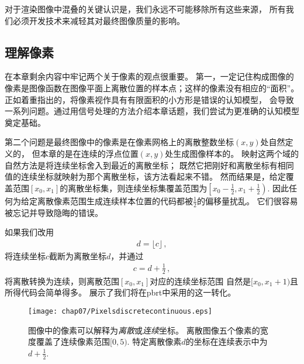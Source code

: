对于渲染图像中混叠的关键认识是，我们永远不可能移除所有这些来源，
所有我们必须开发技术来减轻其对最终图像质量的影响。

\subsection{理解像素}\label{sub:理解像素}
在本章剩余内容中牢记两个关于像素的观点很重要。
第一，一定记住构成图像的像素是图像函数在图像平面上离散位置的样本点；这样的像素没有相应的“面积”。
正如\citet{Smith95apixel}着重指出的，将像素视作具有有限面积的小方形是错误的认知模型，
会导致一系列问题。通过用信号处理的方法介绍本章话题，我们尝试为更准确的认知模型奠定基础。

第二个问题是最终图像中的像素是在像素网格上的离散整数坐标$(x,y)$处自然定义的，
但本章的是在连续的浮点位置$(x,y)$处生成图像样本的。
映射这两个域的自然方法是将连续坐标舍入到最近的离散坐标；
既然它把刚好和离散坐标有相同值的连续坐标就映射为那个离散坐标，该方法看起来不错。
然而结果是，给定覆盖范围$[x_0,x_1]$的离散坐标集，则连续坐标集覆盖范围为$\displaystyle\left[x_0-\frac{1}{2},x_1+\frac{1}{2}\right)$.
因此任何为给定离散像素范围生成连续样本位置的代码都被$\displaystyle\frac{1}{2}$的偏移量扰乱。
它们很容易被忘记并导致隐晦的错误。

如果我们改用
\begin{align*}
    d=\lfloor c\rfloor\, ,
\end{align*}
将连续坐标$c$截断为离散坐标$d$，并通过
\begin{align*}
    c=d+\frac{1}{2}\, ,
\end{align*}
将离散转换为连续，则离散范围$[x_0,x_1]$对应的连续坐标范围
自然是$[x_0,x_1+1)$且所得代码会简单得多\citep{HECKBERT1990246}。
展示了我们将在pbrt中采用的这一转化。
\begin{figure}[htbp]
    \centering\texttt{[image: chap07/Pixelsdiscretecontinuous.eps]}
    \caption{图像中的像素可以解释为\emph{离散}或\emph{连续}坐标。
    离散图像五个像素的宽度覆盖了连续像素范围$[0,5)$.
    特定离散像素$d$的坐标在连续表示中为$\displaystyle d+\frac{1}{2}$.}
    \label{fig:7.12}
\end{figure}